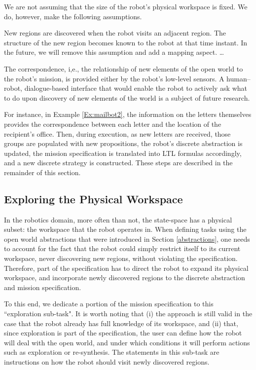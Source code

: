 We are not assuming that the size of the robot's physical workspace is fixed. We do, however, make the following assumptions.

\begin{myAssumption}
	New regions are discovered when the robot visits an adjacent region. The structure of the new region becomes known to the robot at that time instant. In the future, we will remove this assumption and add a mapping aspect. \ldots
\end{myAssumption}

\begin{myAssumption}
	The correspondence, i,e., the relationship of new elements of the open world to the robot's mission, is provided either by the robot's low-level sensors. A human--robot, dialogue-based interface that would enable the robot to actively ask what to do upon discovery of new elements of the world is a subject of future research.
\end{myAssumption}

For instance, in Example \ref{Ex:mailbot2}, the information on the letters themselves provides the correspondence between each letter and the location of the recipient's office. Then, during execution, as new letters are received, those groups are populated with new propositions, the robot's discrete abstraction is updated, the mission specification is translated into LTL formulas accordingly, and a new discrete strategy is constructed. These steps are described in the remainder of this section.

\subsection{Exploring the Physical Workspace}

In the robotics domain, more often than not, the state-space has a physical subset: the workspace that the robot operates in. When defining tasks using the open world abstractions that were introduced in Section \ref{abstractions}, one needs to account for the fact that the robot could simply restrict itself to its current workspace, never discovering new regions, without violating the specification. Therefore, part of the specification has to direct the robot to expand its physical workspace, and incorporate newly discovered regions to the discrete abstraction and mission specification.

To this end, we dedicate a portion of the mission specification to this ``exploration sub-task". It is worth noting that (i) the approach is still valid in the case that the robot already has full knowledge of its workspace, and (ii) that, since exploration is part of the specification, the user can define how the robot will deal with the open world, and under which conditions it will perform actions such as exploration or re-synthesis. The statements in this sub-task are instructions on how the robot should visit newly discovered regions.

